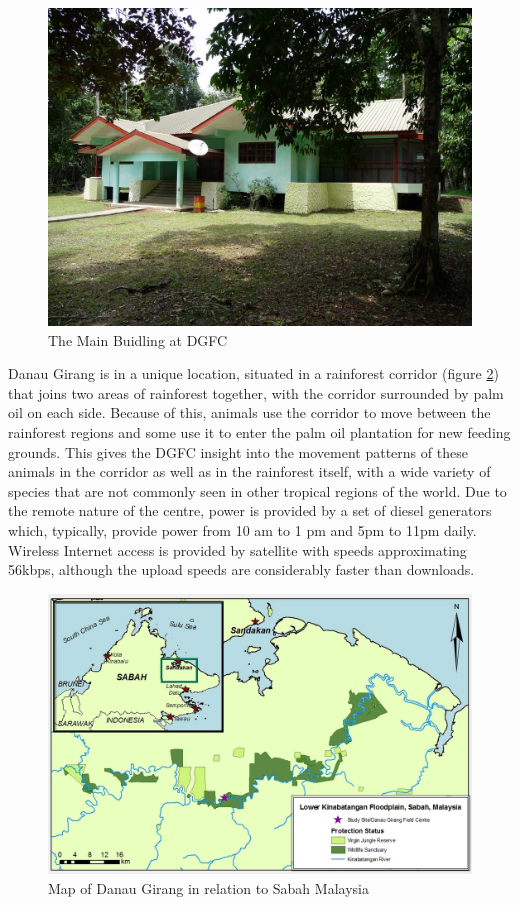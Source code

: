 		\begin{figure}[h]
		\centering
		\includegraphics[width=\textwidth]{Chap3/figures/field_centre.JPG}
		\caption{The Main Buidling at DGFC}
		\label{tech:fig:main}
		\end{figure}

Danau Girang is in a unique location, situated in a rainforest corridor (figure \ref{tech:fig:map}) that joins two areas of rainforest together, with the corridor surrounded by palm oil on each side. Because of this, animals use the corridor to move between the rainforest regions and some use it to enter the palm oil plantation for new feeding grounds. This gives the DGFC insight into the movement patterns of these animals in the corridor as well as in the rainforest itself, with a wide variety of species that are not commonly seen in other tropical regions of the world. Due to the remote nature of the centre, power is provided by a set of diesel generators which, typically, provide power from 10 am to 1 pm and 5pm to 11pm daily. Wireless Internet access is provided by satellite with speeds approximating 56kbps, although the upload speeds are considerably faster than downloads.

		\begin{figure}[h]
		\centering
		\includegraphics[width=\textwidth]{Chap3/figures/dgfc_map}
		\caption{Map of Danau Girang in relation to Sabah Malaysia}
		\label{tech:fig:map}
		\end{figure}

